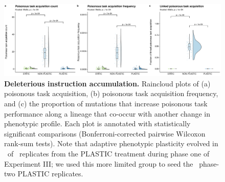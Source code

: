 \begin{figure}[h!]
    \centering
    \includegraphics[width=1.0\textwidth]{media/poison-accumulation-panel.pdf}
    \caption{\small
    \textbf{Deleterious instruction accumulation.}
    Raincloud plots of 
    (a) poisonous task acquisition,
    (b) poisonous task acquisition frequency,
    and (c) the proportion of mutations that increase poisonous task performance along a lineage that co-occur with another change in phenotypic profile.
    Each plot is annotated with statistically significant comparisons (Bonferroni-corrected pairwise Wilcoxon rank-sum tests).
    Note that adaptive phenotypic plasticity evolved in \deleteriousHitchhikingPlasticReps\ of \deleteriousHitchhikingReplicates\ replicates from the PLASTIC treatment during phase one of Experiment III; we used this more limited group to seed the \deleteriousHitchhikingPlasticReps\ phase-two PLASTIC replicates.
    }
    \label{fig:deleterious-hitchhiking}
\end{figure}